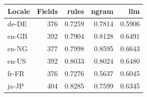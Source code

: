 \begingroup\small\setlength{\tabcolsep}{4pt}
\begin{tabular}{lrrrr}
\toprule
\textbf{Locale} & \textbf{Fields} & \textbf{rules} & \textbf{ngram} & \textbf{llm} \\
\midrule
de-DE & 376 & 0.7259 & 0.7814 & 0.5906 \\  %
en-GB & 392 & 0.7904 & 0.8128 & 0.6491 \\  %
en-NG & 377 & 0.7998 & 0.8595 & 0.6643 \\  %
en-US & 392 & 0.8033 & 0.8024 & 0.6480 \\  %
fr-FR & 376 & 0.7276 & 0.5637 & 0.6045 \\  %
ja-JP & 404 & 0.8285 & 0.7599 & 0.6345 \\  %
\bottomrule
\end{tabular}
\endgroup
\par\smallskip{}
